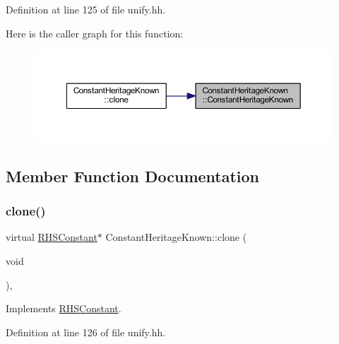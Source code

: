 Definition at line 125 of file unify.\+hh.

Here is the caller graph for this function\+:
\nopagebreak
\begin{figure}[H]
\begin{center}
\leavevmode
\includegraphics[width=350pt]{class_constant_heritage_known_aa29b63bf5dba8c4b2e4a177aefebe536_icgraph}
\end{center}
\end{figure}


\subsection{Member Function Documentation}
\mbox{\label{class_constant_heritage_known_a07568a5e04c406e0a08fe2f07f15ccc1}} 
\subsubsection{\texorpdfstring{clone()}{clone()}}
{\footnotesize\ttfamily virtual \mbox{\hyperlink{class_r_h_s_constant}{R\+H\+S\+Constant}}$\ast$ Constant\+Heritage\+Known\+::clone (\begin{DoxyParamCaption}\item[{void}]{ }\end{DoxyParamCaption})\hspace{0.3cm}{\ttfamily [inline]}, {\ttfamily [virtual]}}



Implements \mbox{\hyperlink{class_r_h_s_constant_a3e43335a89351a453932a8c0544d5722}{R\+H\+S\+Constant}}.



Definition at line 126 of file unify.\+hh.

